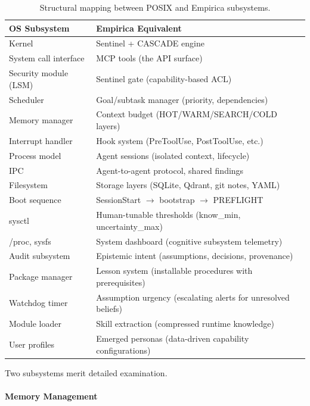 \begin{table}[h]
\centering
\begin{tabular}{ll}
\toprule
\textbf{OS Subsystem} & \textbf{Empirica Equivalent} \\
\midrule
Kernel & Sentinel + CASCADE engine \\
System call interface & MCP tools (the API surface) \\
Security module (LSM) & Sentinel gate (capability-based ACL) \\
Scheduler & Goal/subtask manager (priority, dependencies) \\
Memory manager & Context budget (HOT/WARM/SEARCH/COLD layers) \\
Interrupt handler & Hook system (PreToolUse, PostToolUse, etc.) \\
Process model & Agent sessions (isolated context, lifecycle) \\
IPC & Agent-to-agent protocol, shared findings \\
Filesystem & Storage layers (SQLite, Qdrant, git notes, YAML) \\
Boot sequence & SessionStart $\rightarrow$ bootstrap $\rightarrow$ PREFLIGHT \\
sysctl & Human-tunable thresholds (know\_min, uncertainty\_max) \\
/proc, sysfs & System dashboard (cognitive subsystem telemetry) \\
Audit subsystem & Epistemic intent (assumptions, decisions, provenance) \\
Package manager & Lesson system (installable procedures with prerequisites) \\
Watchdog timer & Assumption urgency (escalating alerts for unresolved beliefs) \\
Module loader & Skill extraction (compressed runtime knowledge) \\
User profiles & Emerged personas (data-driven capability configurations) \\
\bottomrule
\end{tabular}
\caption{Structural mapping between POSIX and Empirica subsystems.}
\label{tab:os-mapping}
\end{table}

Two subsystems merit detailed examination.

\paragraph{Memory Management}

